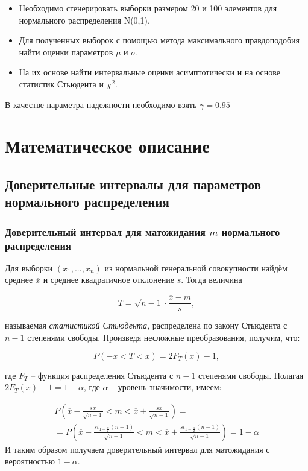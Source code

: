 \documentclass[12pt]{article}
\begin{document}
\begin{itemize}
\item Необходимо сгенерировать выборки размером 20 и 100 элементов для нормального распределения N(0,1). 
\item Для полученных выборок с помощью метода максимального правдоподобия найти  оценки параметров $\mu$  и $\sigma$. 
\item На их основе найти интервальные оценки асимптотически и на основе статистик Стьюдента и $\chi^2$.
\end{itemize}
В качестве параметра надежности необходимо взять $\gamma = 0.95$

\newpage	

	\section{Математическое описание}
	
	\subsection{Доверительные интервалы для параметров нормального распределения}

\subsubsection{Доверительный интервал для матожидания $m$ нормального распределения}

Для выборки $(x_1, ..., x_n)$ из нормальной генеральной совокупности найдём среднее $\overline{x}$ и среднее квадратичное отклонение $s$.
\vskip 0.3cm
Тогда величина 

\begin{equation}
	T = \sqrt{n - 1} \cdot \frac{\overline{x} - m}{s},
\end{equation}

называемая {\it статистикой Стьюдента}, распределена по закону Стьюдента с $n-1$ степенями свободы.
\vskip 0.3cm
Произведя несложные преобразования, получим, что:

\begin{equation}
P \left( -x < T < x \right) = 2F_T(x) - 1,
\end{equation}

где $F_T$ -- функция распределения Стьюдента с $n-1$ степенями свободы.
\vskip 0.3cm
Полагая $2F_T(x) - 1 = 1 - \alpha$, где $\alpha$ -- уровень значимости, имеем:

\begin{multline}\label{mStud}
\displaystyle P \left( \overline{x} - \frac{sx}{\sqrt{n-1}} < m < \overline{x} + \frac{sx}{\sqrt{n-1}} \right) = \\
= P \left( \overline{x} - \frac{st_{1 - \frac{\alpha}{2}}(n - 1)}{\sqrt{n-1}} < m < \overline{x} + \frac{st_{1 - \frac{\alpha}{2}}(n - 1)}{\sqrt{n-1}} \right) = 1 - \alpha
\end{multline}
\vskip 0.3cm
И таким образом получаем доверительный интервал для матожидания с вероятностью $1 - \alpha$. \cite{lit1}
\end{document}

